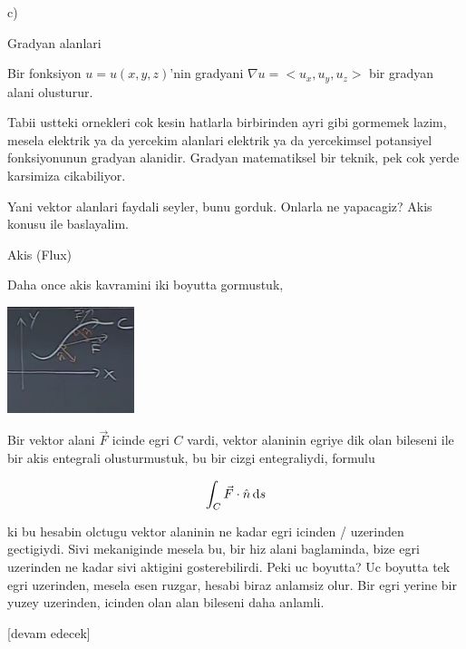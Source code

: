 \documentclass[12pt,fleqn]{article}\usepackage{../../common}
\begin{document}
c)

Gradyan alanlari

Bir fonksiyon $u = u(x,y,z)$'nin gradyani $\nabla u = < u_x, u_y, u_z >$
bir gradyan alani olusturur.

Tabii ustteki ornekleri cok kesin hatlarla birbirinden ayri gibi gormemek lazim,
mesela elektrik ya da yercekim alanlari elektrik ya da yercekimsel potansiyel
fonksiyonunun gradyan alanidir. Gradyan matematiksel bir teknik, pek cok
yerde karsimiza cikabiliyor.

Yani vektor alanlari faydali seyler, bunu gorduk. Onlarla ne yapacagiz?
Akis konusu ile baslayalim.

Akis (Flux)

Daha once akis kavramini iki boyutta gormustuk,

\includegraphics[width=10em]{calc_multi_27_02.png}

Bir vektor alani $\vec{F}$ icinde egri $C$ vardi, vektor alaninin
egriye dik olan bileseni ile bir akis entegrali olusturmustuk, bu
bir cizgi entegraliydi, formulu

$$
\int_C \vec{F} \cdot \hat{n} \,\mathrm{d} s
$$

ki bu hesabin olctugu vektor alaninin ne kadar egri icinden / uzerinden
gectigiydi. Sivi mekaniginde mesela bu, bir hiz alani baglaminda, bize egri
uzerinden ne kadar sivi aktigini gosterebilirdi. Peki uc boyutta? Uc boyutta tek
egri uzerinden, mesela esen ruzgar, hesabi biraz anlamsiz olur. Bir egri yerine
bir yuzey uzerinden, icinden olan alan bileseni daha anlamli.









[devam edecek]
\end{document}
